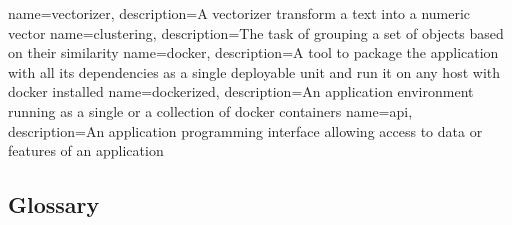 
\renewcommand{\glossarysection}[2][]{}

{
    name=vectorizer,
    description={A vectorizer transform a text into a numeric vector}
}
{
    name=clustering,
    description={The task of grouping a set of objects based on their similarity}
}
{
    name=docker,
    description={A tool to package the application with all its dependencies as a single deployable unit and run it on any host with docker installed}
}
{
    name=dockerized,
    description={An application environment running as a single or a collection of docker containers}
}
{
    name=api,
    description={An application programming interface allowing access to data or features of an application}
}

\glsaddall
\subsection{Glossary}
\printglossaries
